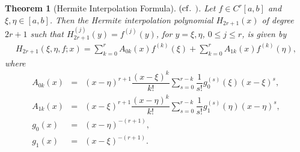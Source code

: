 \documentclass[a4paper,12pt,reqno]{amsart}
\theoremstyle{plain}
\newtheorem{thm}{Theorem}[section]
\numberwithin{equation}{section}
\theoremstyle{definition}
\newcommand{\ds}{\displaystyle}
\begin{document}
\begin{thm}[Hermite Interpolation Formula] $(\mathop{\rm cf.~}$\cite{Spitzbart}$)$.
Let $f\in C^r\left[a,b\right]$ and $\xi,\eta\in[a,b]$. Then the Hermite interpolation polynomial $H_{2r+1}(x)$ of degree $2r+1$ such that
$H_{2r+1}^{(j)}(y)=f^{(j)}(y)$, for $y=\xi,\eta$, $0\leq j\leq r$, is given by
\begin{eqnarray}
H_{2r+1}(\xi,\eta,f;x)=\ds\sum\limits_{k=0}^{r}A_{0k}(x)f^{(k)}(\xi)+\ds\sum\limits_{k=0}^{r}A_{1k}(x)f^{(k)}(\eta),
\end{eqnarray}
where
\begin{eqnarray*}
A_{0k}(x)&=&(x-\eta)^{r+1}\dfrac{(x-\xi)^k}{k!}\ds\sum\limits_{s=0}^{r-k}\dfrac{1}{s!}g_0^{(s)}(\xi)(x-\xi)^s,\\
A_{1k}(x)&=&(x-\xi)^{r+1}\dfrac{(x-\eta)^k}{k!}\ds\sum\limits_{s=0}^{r-k}\dfrac{1}{s!}g_1^{(s)}(\eta)(x-\eta)^s,\\
g_0(x)&=&(x-\eta)^{-(r+1)},\\
g_1(x)&=&(x-\xi)^{-(r+1)}.
\end{eqnarray*}
\end{thm}
\end{document}

